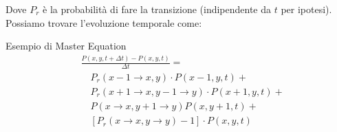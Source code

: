 Dove $P_r$ è la probabilità di fare la transizione (indipendente da $t$ per ipotesi).
Possiamo trovare l'evoluzione temporale come:
\begin{redbox}{Esempio di Master Equation}
    \begin{equation}
        \begin{aligned}
	    &\frac{P(x,y,t+\Delta  t) - P(x,y,t)}{\Delta  t}  =\\
	    & \quad P_r(x-1\to x, y) \cdot P(x-1,y,t) +\\
	    & \quad P_r(x+1\to x, y-1\to y) \cdot P(x+1,y,t) + \\
	    & \quad P(x\to x, y+1\to y) P(x,y+1,t) + \\
	    & \quad \left[P_r(x\to x, y\to y) - 1\right]\cdot P(x,y,t) 
        \end{aligned}
    \end{equation}
\end{redbox}
\newpage
